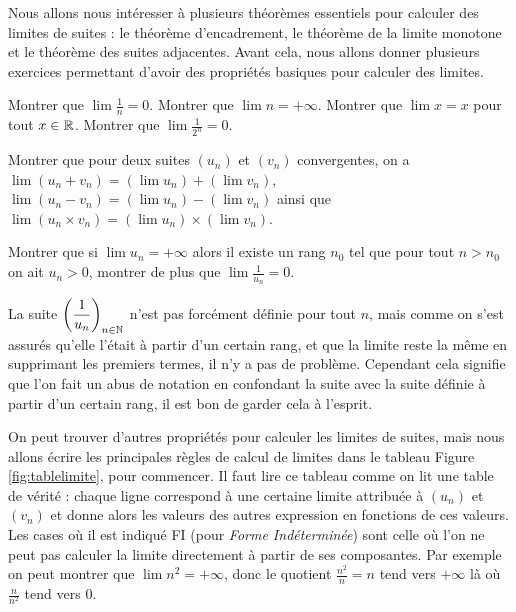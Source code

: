 Nous allons nous intéresser à plusieurs théorèmes essentiels pour calculer des limites de suites : le théorème d'encadrement, le théorème de la limite monotone et le théorème des suites adjacentes. Avant cela, nous allons donner plusieurs exercices permettant d'avoir des propriétés basiques pour calculer des limites.

\begin{exo}
    Montrer que $\lim \frac{1}{n} = 0$. Montrer que $\lim n = +\infty$. Montrer que $\lim x = x$ pour tout $x\in \mathbb{R}$. Montrer que $\lim \frac{1}{2^n} = 0$.
\end{exo}

\begin{exo}
    Montrer que pour deux suites $(u_n)$ et $(v_n)$ convergentes, on a $\lim (u_n+v_n) = (\lim u_n) + (\lim v_n)$, $\lim(u_n-v_n) = (\lim u_n)-(\lim v_n)$ ainsi que $\lim (u_n\times v_n) = (\lim u_n)\times (\lim v_n)$.
\end{exo}

\begin{exo}
    Montrer que si $\lim u_n = +\infty$ alors il existe un rang $n_0$ tel que pour tout $n > n_0$ on ait $u_n > 0$, montrer de plus que $\displaystyle{\lim \frac{1}{u_n}} = 0$.
\end{exo}

\begin{rmk}
    La suite $\displaystyle{\left(\frac{1}{u_n}\right)}_{n\in\mathbb{N}}$ n'est pas forcément définie pour tout $n$, mais comme on s'est assurés qu'elle l'était à partir d'un certain rang, et que la limite reste la même en supprimant les premiers termes, il n'y a pas de problème. Cependant cela signifie que l'on fait un abus de notation en confondant la suite avec la suite définie à partir d'un certain rang, il est bon de garder cela à l'esprit.
\end{rmk}

On peut trouver d'autres propriétés pour calculer les limites de suites, mais nous allons écrire les principales règles de calcul de limites dans le tableau Figure \ref{fig:tablelimite}, pour commencer. Il faut lire ce tableau comme on lit une table de vérité : chaque ligne correspond à une certaine limite attribuée à $(u_n)$ et $(v_n)$ et donne alors les valeurs des autres expression en fonctions de ces valeurs. Les cases où il est indiqué FI (pour \textit{Forme Indéterminée}) sont celle où l'on ne peut pas calculer la limite directement à partir de ses composantes. Par exemple on peut montrer que $\lim n^2 = +\infty$, donc le quotient $\frac{n^2}{n} = n$ tend vers $+\infty$ là où $\frac{n}{n^2}$ tend vers $0$.

